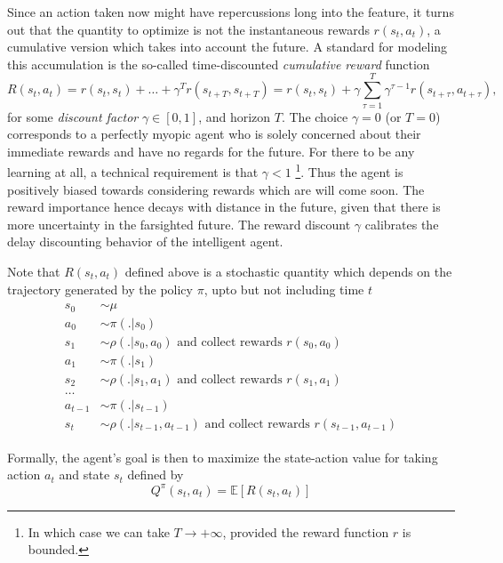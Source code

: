 \documentclass{article} %
\begin{document}
Since an action taken now might have repercussions long into the feature, it turns out that the
quantity to optimize is not the instantaneous rewards $r(s_t, a_t)$, a cumulative version which
takes into account the future. A standard for modeling this accumulation is the so-called
time-discounted \textit{cumulative reward} function
\begin{equation}
  \label{eq:cumr}
  R(s_t, a_t) = r(s_t, s_t) + \ldots + \gamma^Tr(s_{t+T}, s_{t+T})
  = r(s_t, s_t) + \gamma \sum_{\tau=1}^{T}\gamma^{\tau-1}r(s_{t+\tau},a_{t+\tau}),
  \end{equation}
for some \textit{discount factor} $\gamma \in [0, 1]$, and horizon $T$. The choice $\gamma = 0$ (or $T=0$)  corresponds to a perfectly myopic agent who is solely concerned about their immediate rewards and have no regards for the future. For there to be any learning at all, a technical requirement is that $\gamma < 1$ \footnote{In which case we can take $T \rightarrow +\infty$, provided the reward function $r$ is bounded.}.
Thus the agent is positively biased towards considering rewards which are will
come soon. The reward importance hence decays with distance in the future,
given that there is more uncertainty in the farsighted future.
The reward discount $\gamma$ calibrates the delay discounting
behavior of the intelligent agent.

Note that $R(s_t, a_t)$ defined above is a stochastic quantity which depends on the trajectory generated by the policy $\pi$, upto but not including time $t$
\begin{eqnarray*}
  \begin{split}
    s_0 &\sim \mu\\
    a_0 &\sim \pi(.|s_0)\\
    s_1 &\sim \rho(.|s_0,a_0) \text{ and collect rewards }r(s_0, a_0)\\
    a_1 &\sim \pi(.|s_1)\\
    s_2 &\sim \rho(.|s_1,a_1) \text{ and collect rewards }r(s_1, a_1)\\
    \ldots\\
    a_{t-1} &\sim \pi(.|s_{t-1})\\
    s_{t} &\sim \rho(.|s_{t-1},a_{t-1}) \text{ and collect rewards }r(s_{t-1}, a_{t-1})
  \end{split}
\end{eqnarray*}

Formally, the agent's goal is then to maximize the state-action value for
taking action $a_t$ and state $s_t$ defined by
\begin{equation}
  \label{eq:qval}
  Q^{\pi}(s_t,a_t) = \mathbb E [R(s_t, a_t)]
\end{equation}
\end{document}
